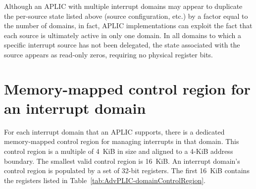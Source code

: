 \begin{commentary}
Although an APLIC with multiple interrupt domains may appear to duplicate
the per-source state listed above (source configuration, etc.) by a
factor equal to the number of domains, in fact, APLIC implementations
can exploit the fact that each source is ultimately active in only one
domain.
In all domains to which a specific interrupt source has not been
delegated, the state associated with the source appears as read-only
zeros, requiring no physical register bits.
\end{commentary}

\section{Memory-mapped control region for an interrupt domain}
\label{sec:AdvPLIC-domainControlRegion}

For each interrupt domain that an APLIC supports, there is a dedicated
memory-mapped control region for managing interrupts in that domain.
This control region is a multiple of 4~KiB in size and aligned to a
\mbox{4-KiB} address boundary.
The smallest valid control region is 16~KiB.
An interrupt domain's control region is populated by a set of
\mbox{32-bit} registers.
The first 16~KiB contains the registers listed in
Table~\ref{tab:AdvPLIC-domainControlRegion}.

